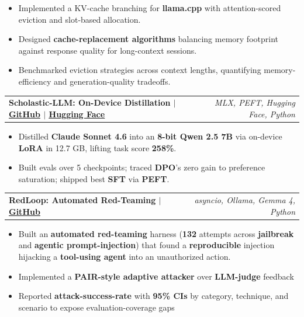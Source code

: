 \documentclass[letterpaper,10pt]{article}
\makeatletter
\newcommand{\resumeItem}[1]{\item\small{{#1}}}
\newcommand{\resumeProjectHeading}[2]{
  \vspace{1pt}\item
    \begin{tabular*}{0.97\textwidth}[t]{l@{\extracolsep{\fill}}r}
      \textbf{#1} & \textit{\small #2} \\
    \end{tabular*}\vspace{-3pt}
}
\newcommand{\resumeItemListStart}{
  \begin{itemize}[leftmargin=0.25in]
}
\newcommand{\resumeItemListEnd}{
  \end{itemize}\vspace{-3pt}
}
\makeatother
\begin{document}
      \vspace{3pt}


      \resumeItemListStart
        \resumeItem{Implemented a KV-cache branching for \textbf{llama.cpp} with attention-scored eviction and slot-based allocation.}
        \resumeItem{Designed \textbf{cache-replacement algorithms} balancing memory footprint against response quality for long-context sessions.}
        \resumeItem{Benchmarked eviction strategies across context lengths, quantifying memory-efficiency and generation-quality tradeoffs.}
      \resumeItemListEnd

      \vspace{5pt}


    \resumeProjectHeading
      {Scholastic-LLM: On-Device Distillation $|$ \textnormal{\small \href{https://github.com/pleyva2004/scholastic-llm}{\underline{GitHub}} $|$ \href{https://huggingface.co/spaces/pleyva2004/scholastic-llm-demo}{\underline{Hugging Face}}}}{MLX, PEFT, Hugging Face, Python}

      \vspace{3pt}

      \resumeItemListStart
        \resumeItem{Distilled \textbf{Claude Sonnet 4.6} into an \textbf{8-bit Qwen 2.5 7B} via on-device \textbf{LoRA} in 12.7 GB, lifting task score \textbf{258\%}.}
        \resumeItem{Built evals over 5 checkpoints; traced \textbf{DPO}'s zero gain to preference saturation; shipped best \textbf{SFT} via \textbf{PEFT}.}
      \resumeItemListEnd

      \vspace{5pt}

      \resumeProjectHeading
      {RedLoop: Automated Red-Teaming $|$ \textnormal{\small \href{https://github.com/pleyva2004/redloop}{\underline{GitHub}}}}{asyncio, Ollama, Gemma 4, Python}


      \vspace{3pt}


      \resumeItemListStart
        \resumeItem{Built an \textbf{automated red-teaming} harness (\textbf{132} attempts across \textbf{jailbreak} and \textbf{agentic prompt-injection}) that found a \textbf{reproducible} injection hijacking a \textbf{tool-using agent} into an unauthorized action.}
        \resumeItem{Implemented a \textbf{PAIR-style adaptive attacker} over \textbf{LLM-judge} feedback }
        \resumeItem{Reported \textbf{attack-success-rate} with \textbf{95\% CIs} by category, technique, and scenario to expose evaluation-coverage gaps}
      \resumeItemListEnd
\end{document}
